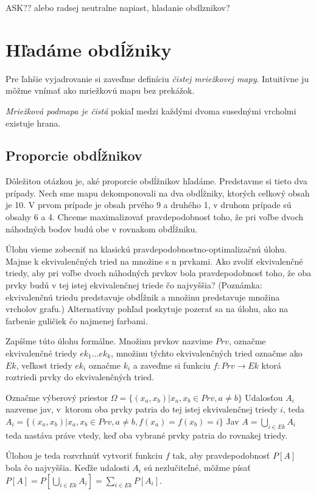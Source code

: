 ASK?? alebo radsej neutralne napiast, hladanie obdlznikov?
\section{Hľadáme obdĺžniky}

Pre ľahšie vyjadrovanie si zaveďme definíciu {\sl čistej mriežkovej mapy}. Intuitívne ju môžme vnímať ako mriežkovú
mapu bez prekážok.

\begin{define}
{\sl Mriežková podmapa je čistá} 
pokiaľ medzi každými dvoma susednými vrcholmi existuje hrana.
\end{define}

\subsection{Proporcie obdĺžnikov}
Dôležitou otázkou je, aké proporcie obdĺžnikov hľadáme.
Predstavme si tieto dva prípady. Nech sme mapu dekomponovali na dva obdĺžniky, ktorých celkový obsah je 10.
V prvom prípade je obsah prvého 9 a druhého 1, v druhom prípade sú obsahy 6 a 4. 
Chceme maximalizovať pravdepodobnosť toho, že pri voľbe dvoch náhodných bodov budú obe v rovnakom obdĺžniku.

Úlohu vieme zobecniť na klasickú pravdepodobnostno-optimalizačnú úlohu.
Majme k ekvivalenčných tried na množine s n prvkami. Ako zvoliť ekvivalenčné triedy, aby pri voľbe dvoch náhodných prvkov 
bola pravdepodobnosť toho, že oba prvky budú v tej istej ekvivalenčnej triede čo najvyššia?
(Poznámka: ekvivalenčnú triedu predstavuje obdĺžnik a množinu predstavuje množina vrcholov grafu.)
Alternatívny pohľad poskytuje pozerať sa na úlohu, ako na farbenie guličiek čo najmenej farbami.

Zapíšme túto úlohu formálne.
Množinu prvkov nazvime $Prv$, označme ekvivalenčné triedy $ek_1 \dots ek_k$, množinu týchto ekvivalenčných tried označme ako $Ek$, veľkost 
triedy $ek_i$ označme $k_i$ a zaveďme si funkciu $f \colon Prv \to Ek$ ktorá roztriedi prvky do ekvivalenčných tried.

Označme výberový priestor $\Omega = \{(x_a, x_b) | x_a, x_b \in Prv, a \not= b \}$
Udalosťou $A_i$ nazveme jav, v~ktorom oba prvky patria do tej istej ekvivalenčnej triedy $i$,
teda $A_i = \{(x_a, x_b) | x_a, x_b \in Prv, a \not= b, f(x_a) = f(x_b) = i \}$
Jav $A = \bigcup_{i \in Ek} A_i$ teda nastáva práve vtedy,
 keď oba vybrané prvky patria do rovnakej triedy.

Úlohou je teda rozvrhnúť vytvoriť funkciu $f$ tak, aby pravdepodobnosť $P[A]$ bola čo najvyššia. 
Keďže udalosti $A_i$ sú nezlučiteľné, môžme písať 
$P[A] = P[\bigcup_{i \in Ek} A_i] = \sum_{i \in Ek}P[A_i]$.

